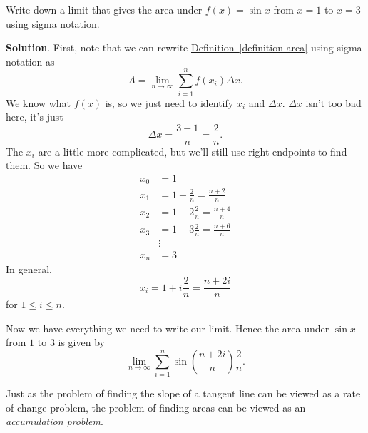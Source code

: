 \documentclass[10pt,]{book}
\theoremstyle{ptxplainnotitle}
\theoremstyle{ptxplaintitle}
\theoremstyle{ptxplainnotitle}
\theoremstyle{ptxplaintitle}
\theoremstyle{ptxplainnotitle}
\theoremstyle{ptxplaintitle}
\theoremstyle{ptxdefinitionnotitle}
\theoremstyle{ptxdefinitiontitle}
\theoremstyle{ptxdefinitionnotitle}
\theoremstyle{ptxdefinitiontitle}
\theoremstyle{ptxdefinitionnotitle}
\theoremstyle{ptxdefinitiontitle}
\theoremstyle{ptxdefinitionnotitle}
\theoremstyle{ptxdefinitiontitle}
\theoremstyle{ptxdefinitionnotitle}
\theoremstyle{ptxdefinitiontitle}
\numberwithin{equation}{section}
\begin{document}
\begin{example}\label{example-areas-using-sigma-notation}
\hypertarget{p-417}{}%
Write down a limit that gives the area under \(f(x) = \sin x\) from \(x=1\) to \(x = 3\) using sigma notation.%
\par\smallskip%
\noindent\textbf{Solution}.\hypertarget{solution-92}{}\quad%
\hypertarget{p-418}{}%
First, note that we can rewrite \hyperref[definition-area]{Definition~\ref{definition-area}} using sigma notation as%
\begin{equation*}
A = \lim_{n\to\infty}\sum_{i=1}^{n}f(x_{i})\Delta x.
\end{equation*}
We know what \(f(x)\) is, so we just need to identify \(x_{i}\) and \(\Delta x\). \(\Delta x\) isn't too bad here, it's just%
\begin{equation*}
\Delta x = \frac{3-1}{n} = \frac{2}{n}.
\end{equation*}
The \(x_{i}\) are a little more complicated, but we'll still use right endpoints to find them. So we have%
\begin{align*}
x_{0} & = 1 \\
x_{1} & = 1 + \frac{2}{n} = \frac{n+2}{n} \\
x_{2} & = 1 + 2\frac{2}{n} = \frac{n+4}{n} \\
x_{3} & = 1 + 3\frac{2}{n} = \frac{n+6}{n} \\
& \vdots \\
x_{n} & = 3 
\end{align*}
In general,%
\begin{equation*}
x_{i} = 1 + i\frac{2}{n} = \frac{n+2i}{n}
\end{equation*}
for \(1\leq i\leq n\).%
\par
\hypertarget{p-419}{}%
Now we have everything we need to write our limit. Hence the area under \(\sin x\) from \(1\) to \(3\) is given by%
\begin{equation*}
\lim_{n\to\infty}\sum_{i=1}^{n}\sin\left(\frac{n+2i}{n}\right)\frac{2}{n}.
\end{equation*}
%
\end{example}
\hypertarget{p-420}{}%
Just as the problem of finding the slope of a tangent line can be viewed as a rate of change problem, the problem of finding areas can be viewed as an \emph{accumulation problem}.%
\end{document}
